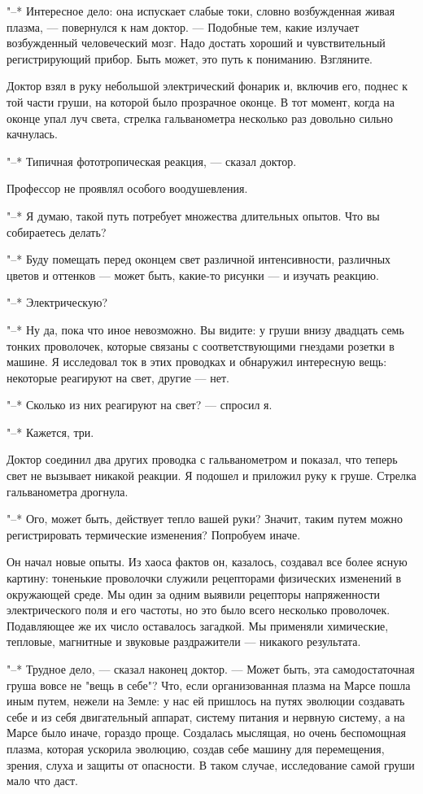 "--* Интересное дело: она испускает слабые токи, словно возбужденная живая
плазма, ---  повернулся  к  нам  доктор.  ---  Подобные  тем,  какие  излучает
возбужденный человеческий мозг.  Надо  достать  хороший  и  чувствительный
регистрирующий прибор. Быть может, это путь к пониманию. Взгляните.

Доктор взял в руку небольшой  электрический  фонарик  и,  включив  его,
поднес к той части груши, на которой было прозрачное оконце. В тот момент,
когда на оконце  упал  луч  света,  стрелка  гальванометра  несколько  раз
довольно сильно качнулась.

"--* Типичная фототропическая реакция, --- сказал доктор.

Профессор не проявлял особого воодушевления.

"--* Я думаю, такой путь потребует множества  длительных  опытов.  Что  вы
собираетесь делать?

"--* Буду помещать перед оконцем свет различной  интенсивности,  различных
цветов и оттенков --- может быть, какие-то рисунки --- и изучать реакцию.

"--* Электрическую?

"--* Ну да, пока что иное невозможно. Вы видите: у  груши  внизу  двадцать
семь  тонких  проволочек,  которые  связаны  с  соответствующими  гнездами
розетки в машине. Я исследовал ток в этих проводках и обнаружил интересную
вещь: некоторые реагируют на свет, другие --- нет.

"--* Сколько из них реагируют на свет? --- спросил я.

"--* Кажется, три.

Доктор соединил два других проводка с  гальванометром  и  показал,  что
теперь свет не вызывает никакой реакции.  Я  подошел  и  приложил  руку  к
груше. Стрелка гальванометра дрогнула.

"--* Ого, может быть, действует тепло  вашей  руки?  Значит,  таким  путем
можно регистрировать термические изменения? Попробуем иначе.

Он начал новые опыты. Из хаоса фактов он, казалось, создавал все  более
ясную  картину:  тоненькие  проволочки  служили   рецепторами   физических
изменений  в  окружающей  среде.  Мы  один  за  одним  выявили   рецепторы
напряженности электрического  поля  и  его  частоты,  но  это  было  всего
несколько проволочек. Подавляющее же  их  число  оставалось  загадкой.  Мы
применяли  химические,  тепловые,  магнитные  и  звуковые  раздражители  ---
никакого результата.

"--*  Трудное  дело,  ---  сказал  наконец  доктор.  ---   Может   быть,   эта
самодостаточная груша вовсе не "вещь в  себе"?  Что,  если  организованная
плазма на Марсе пошла иным путем, нежели на Земле: у нас  ей  пришлось  на
путях эволюции создавать себе и  из  себя  двигательный  аппарат,  систему
питания и нервную систему, а на Марсе было иначе, гораздо проще. Создалась
мыслящая, но очень беспомощная плазма, которая ускорила  эволюцию,  создав
себе машину для перемещения, зрения, слуха и защиты от опасности. В  таком
случае, исследование самой груши мало что даст.

